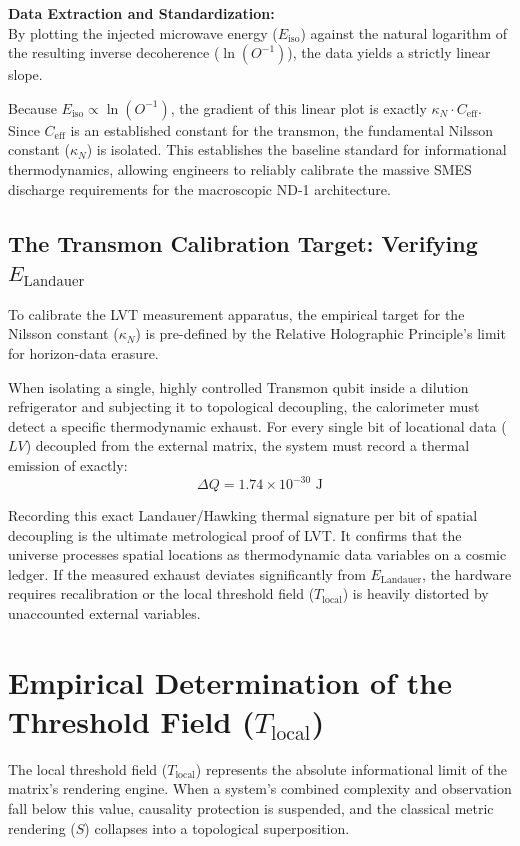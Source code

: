 \documentclass[12pt,a4paper]{article}
\begin{document}
\textbf{Data Extraction and Standardization:} \\
By plotting the injected microwave energy ($E_{\mathrm{iso}}$) against the natural logarithm of the resulting inverse decoherence ($\ln(O^{-1})$), the data yields a strictly linear slope. 

Because $E_{\mathrm{iso}} \propto \ln(O^{-1})$, the gradient of this linear plot is exactly $\kappa_N \cdot C_{\mathrm{eff}}$. Since $C_{\mathrm{eff}}$ is an established constant for the transmon, the fundamental Nilsson constant ($\kappa_N$) is isolated. This establishes the baseline standard for informational thermodynamics, allowing engineers to reliably calibrate the massive SMES discharge requirements for the macroscopic ND-1 architecture.

\subsection{The Transmon Calibration Target: Verifying $E_{\mathrm{Landauer}}$}
To calibrate the LVT measurement apparatus, the empirical target for the Nilsson constant ($\kappa_N$) is pre-defined by the Relative Holographic Principle's limit for horizon-data erasure. 

When isolating a single, highly controlled Transmon qubit inside a dilution refrigerator and subjecting it to topological decoupling, the calorimeter must detect a specific thermodynamic exhaust. For every single bit of locational data ($LV$) decoupled from the external matrix, the system must record a thermal emission of exactly:
\begin{equation}
\Delta Q = 1.74 \times 10^{-30} \text{ J}
\end{equation}

Recording this exact Landauer/Hawking thermal signature per bit of spatial decoupling is the ultimate metrological proof of LVT. It confirms that the universe processes spatial locations as thermodynamic data variables on a cosmic ledger. If the measured exhaust deviates significantly from $E_{\mathrm{Landauer}}$, the hardware requires recalibration or the local threshold field ($T_{\mathrm{local}}$) is heavily distorted by unaccounted external variables.



\section{Empirical Determination of the Threshold Field ($T_{\mathrm{local}}$)}
The local threshold field ($T_{\mathrm{local}}$) represents the absolute informational limit of the matrix's rendering engine. When a system's combined complexity and observation fall below this value, causality protection is suspended, and the classical metric rendering ($S$) collapses into a topological superposition. 
\end{document}
